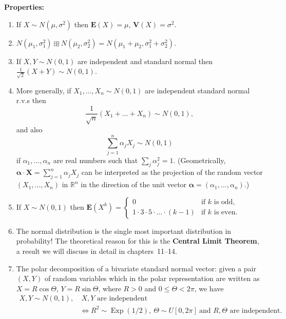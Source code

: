 \documentclass[12pt]{article}
\newcommand{\R}{\mathbb{R}}
\newcommand{\expec}{\mathbf{E}}
\newcommand{\var}{\mathbf{V}}
\newcommand{\indplus}{\boxplus}
\newcommand{\expdist}{\operatorname{Exp}}
\theoremstyle{example}
\begin{document}
\noindent \textbf{Properties:}
\begin{enumerate}

\item If $X\sim N(\mu,\sigma^2)$ then $\expec(X)=\mu$, $\var(X) =\sigma^2$.

\item $N(\mu_1,\sigma_1^2) \indplus N(\mu_2,\sigma_2^2) = N(\mu_1+\mu_2,\sigma_1^2+\sigma_2^2)$.

\item If $X,Y\sim N(0,1)$ are independent and standard normal then $\frac{1}{\sqrt{2}}(X+Y) \sim N(0,1)$.

\item More generally, if $X_1,\ldots,X_n \sim N(0,1)$ are independent standard normal r.v.s then
$$ \frac{1}{\sqrt{n}}(X_1+\ldots+X_n) \sim N(0,1), $$
and also
$$ \sum_{j=1}^n \alpha_j X_j \sim N(0,1) $$
if $\alpha_1,\ldots,\alpha_n$ are real numbers such that $\sum_j \alpha_j^2 = 1$. (Geometrically, 
$\boldsymbol{\alpha}\cdot \mathbf{X} = \sum_{j=1}^n \alpha_j X_j$ can be interpreted as the projection of the random vector $(X_1,\ldots,X_n)$ in $\R^n$ in the direction of the unit vector $\boldsymbol{\alpha}=(\alpha_1,\ldots,\alpha_n)$.)

\item If $X\sim N(0,1)$ then $\expec(X^k) = \begin{cases}
0 & \textrm{if $k$ is odd}, \\
1\cdot 3 \cdot 5 \cdot \ldots \cdot (k-1) & \textrm{if $k$ is even}.
\end{cases}
$

\item The normal distribution is the single most important distribution in probability! The theoretical reason for this is the \textbf{Central Limit Theorem}, a result we will discuss in detail in chapters~11--14.

\item The polar decomposition of a bivariate standard normal vector: given a pair $(X,Y)$ of random variables which in the polar representation are written as $X=R\cos\Theta$, $Y=R\sin \Theta$, where $R>0$ and $0\le \Theta<2\pi$, we have
\begin{align*}
X,Y\sim N(0,1), & \ X,Y\textrm{ are independent } 
\\ & \iff R^2 \sim \expdist(1/2), \ \Theta\sim U[0,2\pi]\ \textrm{and $R,\Theta$ are independent.}
\end{align*}

\end{enumerate}
\end{document}
